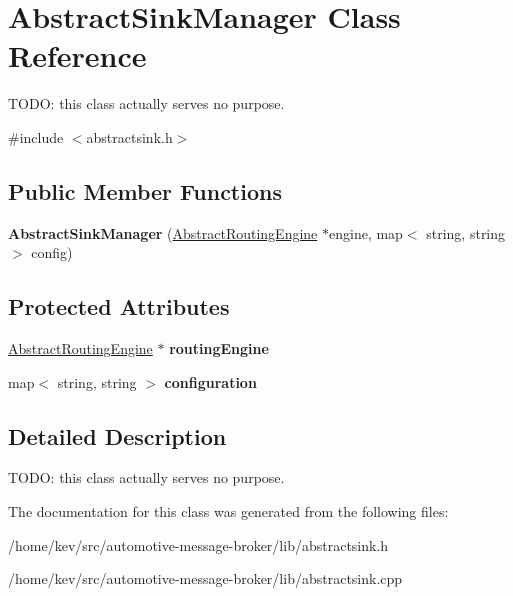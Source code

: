 \hypertarget{classAbstractSinkManager}{\section{Abstract\-Sink\-Manager Class Reference}
\label{classAbstractSinkManager}
}


T\-O\-D\-O\-: this class actually serves no purpose.  




{\ttfamily \#include $<$abstractsink.\-h$>$}

\subsection*{Public Member Functions}
\begin{DoxyCompactItemize}
\item 
\hypertarget{classAbstractSinkManager_a8c2b065455e7392bbef66056e492cf54}{{\bfseries Abstract\-Sink\-Manager} (\hyperlink{classAbstractRoutingEngine}{Abstract\-Routing\-Engine} $\ast$engine, map$<$ string, string $>$ config)}\label{classAbstractSinkManager_a8c2b065455e7392bbef66056e492cf54}

\end{DoxyCompactItemize}
\subsection*{Protected Attributes}
\begin{DoxyCompactItemize}
\item 
\hypertarget{classAbstractSinkManager_aa4951761c33e7012c3a0e72e099354b3}{\hyperlink{classAbstractRoutingEngine}{Abstract\-Routing\-Engine} $\ast$ {\bfseries routing\-Engine}}\label{classAbstractSinkManager_aa4951761c33e7012c3a0e72e099354b3}

\item 
\hypertarget{classAbstractSinkManager_ac329710da75b1c757584ec42a8072ea4}{map$<$ string, string $>$ {\bfseries configuration}}\label{classAbstractSinkManager_ac329710da75b1c757584ec42a8072ea4}

\end{DoxyCompactItemize}


\subsection{Detailed Description}
T\-O\-D\-O\-: this class actually serves no purpose. 

The documentation for this class was generated from the following files\-:\begin{DoxyCompactItemize}
\item 
/home/kev/src/automotive-\/message-\/broker/lib/abstractsink.\-h\item 
/home/kev/src/automotive-\/message-\/broker/lib/abstractsink.\-cpp\end{DoxyCompactItemize}
